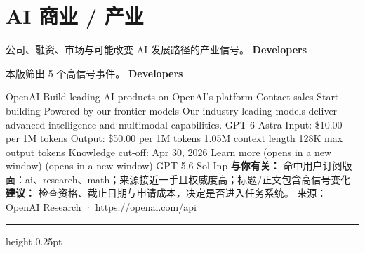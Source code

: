 \documentclass[10.5pt]{ctexart}
\begin{document}
\section*{AI 商业 / 产业}
{\color{ormuted} 公司、融资、市场与可能改变 AI 发展路径的产业信号。}
\vspace{2mm}
{\LARGE\bfseries Developers}\par
\vspace{1mm}
{\color{ormuted} 本版筛出 5 个高信号事件。}
\vspace{3mm}
{\Large\bfseries Developers}\par
OpenAI Build leading AI products on OpenAI’s platform Contact sales Start building Powered by our frontier models Our industry-leading models deliver advanced intelligence and multimodal capabilities. GPT-6 Astra Input: \$10.00 per 1M tokens Output: \$50.00 per 1M tokens 1.05M context length 128K max output tokens Knowledge cut-off: Apr 30, 2026 Learn more (opens in a new window) (opens in a new window) GPT-5.6 Sol Inp
\textbf{与你有关：} 命中用户订阅版面：ai、research、math；来源接近一手且权威度高；标题/正文包含高信号变化
\textbf{建议：} 检查资格、截止日期与申请成本，决定是否进入任务系统。
{\footnotesize\color{ormuted} 来源：OpenAI Research · \url{https://openai.com/api}}
\vspace{4mm}
\hrule height 0.25pt
\vspace{3mm}
\end{document}
